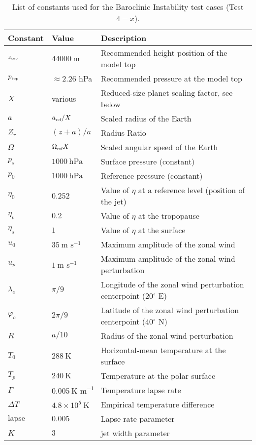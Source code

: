 \documentclass{article}
\begin{document}
 
\begin{table}[h]

\caption{List of constants used for the Baroclinic Instability test cases (Test $4-x$).}
\label{test4:tab}
\begin{tabular*}{\textwidth}{@{\extracolsep{\fill}}lll}
\hline Constant & Value & Description \\
\hline 
$z_{\tiny \mbox{top}}$ & $44000\ \mbox{m}$ & Recommended height position of the model top \\
$p_{\tiny \mbox{top}}$ & $\approx 2.26$ hPa & Recommended pressure at the model top\\
$X$ & various & Reduced-size planet scaling factor, see below\\
$a$ & $a_{\tiny \mbox{ref}}/X$ & Scaled radius of the Earth \\
$Z_r$ & $(z+a)/a$ & Radius Ratio\\
$\Omega$ & $\Omega_{\tiny \mbox{ref}}X$ & Scaled angular speed of the Earth \\
$p_s$ & $1000\ \mbox{hPa}$ & Surface pressure (constant) \\
$p_0$ & $1000\ \mbox{hPa}$ & Reference pressure (constant) \\
$\eta_0$ & $0.252$ & Value of $\eta$ at a reference level (position of the jet)\\
$\eta_t$ & $0.2$ & Value of $\eta$ at the tropopause \\
$\eta_s$ & $1$ & Value of $\eta$ at the surface \\
$u_0$ & $35\ \mbox{m\ s}^{-1}$ & Maximum amplitude of the zonal wind \\
$u_p$ & $1\ \mbox{m\ s}^{-1}$ & Maximum amplitude of the zonal wind perturbation \\
$\lambda_c$ & $\pi / 9$ & Longitude of the zonal wind perturbation centerpoint (20$^\circ$ E)\\
$\varphi_c$ & $2 \pi / 9$ & Latitude of the zonal wind perturbation centerpoint (40$^\circ$ N)\\
$R$ & $a / 10$ & Radius of the zonal wind perturbation \\
$T_0$ & $288\ \mbox{K}$ & Horizontal-mean temperature at the surface \\
$T_p$ & $240 \ \mbox{K}$ & Temperature at the polar surface\\
$\Gamma$ & $0.005\ \mbox{K\ m}^{-1}$ & Temperature lapse rate \\
$\Delta T$ & $4.8 \times 10^{5}\ \mbox{K}$ & Empirical temperature difference \\
$\text{lapse}$ & $0.005$ & Lapse rate parameter \\
$K$ & $3$ & jet width parameter \\
\hline 
\end{tabular*}

\end{table}
\end{document}
